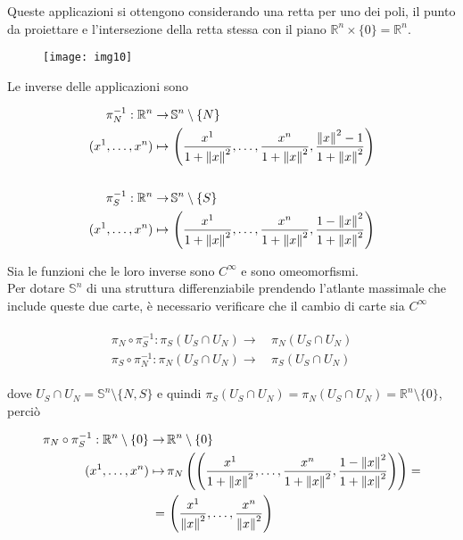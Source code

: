 Queste applicazioni si ottengono considerando una retta per uno dei poli, il punto da proiettare e l'intersezione della retta stessa con il piano $ \mathbb{R}^{n} \times \{0\} = \mathbb{R}^{n} $.

\begin{figure}[H]
	\centering
	\texttt{[image: img10]}
\end{figure}

Le inverse delle applicazioni sono

\begin{align}
	\begin{split}
		\pi_{N}^{-1} : \mathbb{R}^{n} \to& \, \mathbb{S}^{n} \setminus \{N\}\\
		(x^{1},\dots,x^{n}) \mapsto& \, \left( \dfrac{x^{1}}{1+\norm{x}^{2}},\dots,\dfrac{x^{n}}{1+\norm{x}^{2}},\dfrac{\norm{x}^{2}-1}{1+\norm{x}^{2}} \right)\\\\
		\pi_{S}^{-1} : \mathbb{R}^{n} \to& \, \mathbb{S}^{n} \setminus \{S\}\\
		(x^{1},\dots,x^{n}) \mapsto& \, \left( \dfrac{x^{1}}{1+\norm{x}^{2}},\dots,\dfrac{x^{n}}{1+\norm{x}^{2}},\dfrac{1-\norm{x}^{2}}{1+\norm{x}^{2}} \right)
	\end{split}
\end{align}

Sia le funzioni che le loro inverse sono $ C^{\infty} $ e sono omeomorfismi.\\
Per dotare $ \mathbb{S}^{n} $ di una struttura differenziabile prendendo l'atlante massimale che include queste due carte, è necessario verificare che il cambio di carte sia $ C^{\infty} $

\begin{align}
	\begin{split}
		\pi_{N} \circ \pi_{S}^{-1} : \pi_{S}(U_{S} \cap U_{N}) \to& \, \pi_{N}(U_{S} \cap U_{N})\\
		\pi_{S} \circ \pi_{N}^{-1} : \pi_{N}(U_{S} \cap U_{N}) \to& \, \pi_{S}(U_{S} \cap U_{N})
	\end{split}
\end{align}

dove $ U_{S} \cap U_{N} = \mathbb{S}^{n} \setminus \{N,S\} $ e quindi $ \pi_{S}(U_{S} \cap U_{N}) = \pi_{N}(U_{S} \cap U_{N}) = \mathbb{R}^{n} \setminus \{0\} $, perciò

\begin{align}
	\begin{split}
		\pi_{N} \circ \pi_{S}^{-1} : \mathbb{R}^{n} \setminus \{0\} \to& \, \mathbb{R}^{n} \setminus \{0\}\\
		(x^{1},\dots,x^{n}) \mapsto& \, \pi_{N}\left(\left( \dfrac{x^{1}}{1+\norm{x}^{2}},\dots,\dfrac{x^{n}}{1+\norm{x}^{2}},\dfrac{1-\norm{x}^{2}}{1+\norm{x}^{2}} \right)\right) =\\
		=& \, \left( \dfrac{x^{1}}{\norm{x}^{2}},\dots,\dfrac{x^{n}}{\norm{x}^{2}} \right)
	\end{split}
\end{align}

